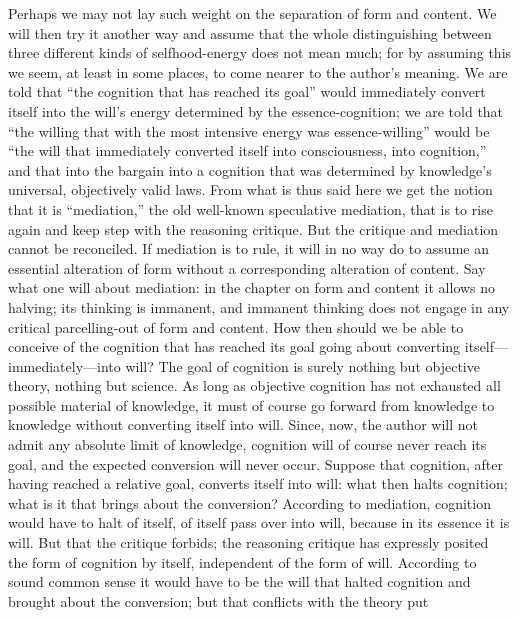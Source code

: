 \documentclass[12pt]{book}
\newcommand{\opage}[1]{\marginnote{\footnotesize\textit{[#1]}}}
\begin{document}
Perhaps we may not lay such weight on the separation of form and content.
We will then try it another way and assume that the whole distinguishing
between three different kinds of selfhood-energy does not mean much; for
by assuming this we seem, at least in some places, to come nearer to the
author's meaning. We are told that ``the cognition that has reached its
goal'' would immediately convert itself into the will's energy determined
by the essence-cognition; we are told that ``the willing that with the
most intensive energy was essence-willing'' would be ``the will that
immediately converted itself into consciousness, into cognition,'' and
that into the bargain into a cognition that was determined by knowledge's
universal, objectively valid laws. From what is thus said here we get the
notion that it is ``mediation,'' the old well-known speculative mediation,
that is to rise again and keep step with the reasoning critique. But the
critique and mediation cannot be reconciled. If mediation is to rule, it
will in no way do to assume an essential alteration of form without a
corresponding alteration of content. Say what one will about mediation: in
the chapter on form and content it allows no halving; its thinking is
immanent, and immanent thinking does not engage in any critical
parcelling-out of form and content. How then should we be able to conceive
of the cognition that has reached its goal going about converting
itself---immediately---into will? The goal of cognition is surely nothing
but objective theory, nothing but science. As long as objective cognition
has not exhausted all possible material of knowledge, it must of course go
forward from knowledge to knowledge without converting itself into will.
Since, now, the author will not admit any
\opage{41}\setcounter{footnote}{0}%
absolute limit of knowledge, cognition will of course never reach its
goal, and the expected conversion will never occur.
Suppose that cognition, after having reached a relative goal, converts
itself into will: what then halts cognition; what is it that brings about
the conversion? According to mediation, cognition would have to halt of
itself, of itself pass over into will, because in its essence it is will.
But that the critique forbids; the reasoning critique has expressly posited
the form of cognition by itself, independent of the form of will. According
to sound common sense it would have to be the will that halted cognition and
brought about the conversion; but that conflicts with the theory put
\end{document}

